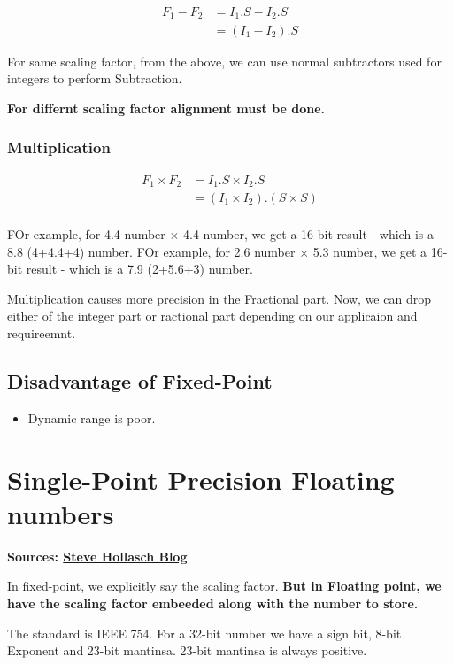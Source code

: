 \documentclass{article}
\begin{document}
\begin{align*}
    F_1 - F_2 & = I_1.S - I_2.S \\
              & = (I_1 - I_2).S
\end{align*}

For same scaling factor, from the above, we can use normal subtractors used for integers to perform Subtraction.

\textbf{For differnt scaling factor alignment must be done.}

\subsubsection{Multiplication}

\begin{align*}
    F_1 \times F_2 & = I_1.S \times I_2.S             \\
                   & = (I_1 \times I_2). (S \times S) \\
\end{align*}

FOr example, for 4.4 number $\times$ 4.4 number, we get a 16-bit result - which is a 8.8 (4+4.4+4) number.
FOr example, for 2.6 number $\times$ 5.3 number, we get a 16-bit result - which is a 7.9 (2+5.6+3) number.

Multiplication causes more precision in the Fractional part.
Now, we can drop either of the integer part or ractional part depending on our applicaion and requireemnt.


\subsection{Disadvantage of Fixed-Point}
\begin{itemize}
    \item Dynamic range is poor.
\end{itemize}



\section{Single-Point Precision Floating numbers}
\textbf{Sources: \href{http://steve.hollasch.net/cgindex/coding/ieeefloat.html}{Steve Hollasch Blog}}

In fixed-point, we explicitly say the scaling factor.
\textbf{But in Floating point, we have the scaling factor embeeded along with the number to store.}

The standard is IEEE 754.
For a 32-bit number we have a sign bit, 8-bit Exponent and 23-bit mantinsa.
23-bit mantinsa is always positive.
\end{document}
